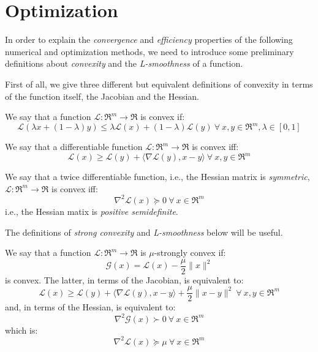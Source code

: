 \section{Optimization}

In order to explain the \emph{convergence} and \emph{efficiency} properties of the following numerical and optimization methods, we need to introduce some preliminary definitions about \emph{convexity} and the \emph{L-smoothness} of a function.

First of all, we give three different but equivalent definitions of convexity in terms of the function itself, the Jacobian and the Hessian.

\begin{definition}[Convexity]
We say that a function $\mathcal{L}: \Re^m \rightarrow \Re$ is convex if: 
$$ 
\mathcal{L}(\lambda x + (1 - \lambda) y ) \leq \lambda \mathcal{L}(x) + (1 - \lambda) \mathcal{L}(y) \ \forall \ x, y \in \Re^m, \lambda \in [0,1] 
$$
\end{definition}

\begin{definition}
We say that a differentiable function $\mathcal{L}: \Re^m \rightarrow \Re$ is convex iff: 
$$
\mathcal{L}(x) \geq \mathcal{L}(y) + \langle \nabla \mathcal{L}(y), x - y \rangle \ \forall \ x, y \in \Re^m
$$
\end{definition}

\begin{definition}
We say that a twice differentiable function, i.e., the Hessian matrix is \emph{symmetric}, $\mathcal{L}: \Re^m \rightarrow \Re$ is convex iff: 
$$
\nabla^2 \mathcal{L}(x) \succeq 0 \ \forall \ x \in \Re^m
$$
i.e., the Hessian matix is \emph{positive semidefinite}.
\end{definition}

The definitions of \emph{strong convexity} and \emph{L-smoothness} below will be useful.

\begin{definition}
We say that a function $\mathcal{L}: \Re^m \rightarrow \Re$ is $\mu$-strongly convex if:
$$
\mathcal{G}(x) = \mathcal{L}(x) - \frac{\mu}{2} \| x \|^2
$$
is convex. The latter, in terms of the Jacobian, is equivalent to:
$$
\mathcal{L}(x) \geq \mathcal{L}(y) + \langle \nabla \mathcal{L}(y), x - y \rangle + \frac{\mu}{2} \| x - y \|^2 \ \forall \ x, y \in \Re^m
$$
and, in terms of the Hessian, is equivalent to:
$$
\nabla^2 \mathcal{G}(x) \succ 0 \ \forall \ x \in \Re^m
$$
which is:
$$
\nabla^2 \mathcal{L}(x) \succeq \mu \ \forall \ x \in \Re^m
$$
\end{definition}

